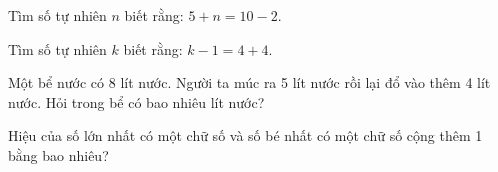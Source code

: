 \begin{ex} %
Tìm số tự nhiên $n$ biết rằng: $5 + n = 10 - 2$.
\end{ex}

\begin{ex} %
Tìm số tự nhiên $k$ biết rằng: $k - 1 = 4 + 4$.
\end{ex}

\begin{ex} %
Một bể nước có 8 lít nước. Người ta múc ra 5 lít nước rồi lại đổ vào thêm 4 lít nước. Hỏi trong bể có bao nhiêu lít nước?
\end{ex}

\begin{ex} %
Hiệu của số lớn nhất có một chữ số và số bé nhất có một chữ số cộng thêm 1 bằng bao nhiêu?
\end{ex}

